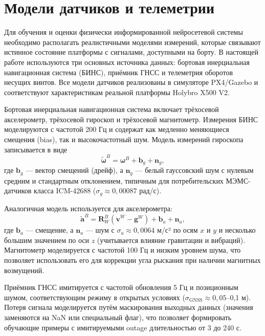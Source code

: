 \section{Модели датчиков и телеметрии}
\label{sec:sensor_models}

Для обучения и оценки физически информированной нейросетевой системы необходимо располагать реалистичными моделями измерений, которые связывают истинное состояние платформы с сигналами, доступными на борту. В настоящей работе используются три основных источника данных: бортовая инерциальная навигационная система (БИНС), приёмник ГНСС и телеметрия оборотов несущих винтов. Все модели датчиков реализованы в симуляторе PX4/Gazebo и соответствуют характеристикам реальной платформы Holybro X500 V2.

Бортовая инерциальная навигационная система включает трёхосевой акселерометр, трёхосевой гироскоп и трёхосевой магнитометр. Измерения БИНС моделируются с частотой 200 Гц и содержат как медленно меняющиеся смещения (bias), так и высокочастотный шум. Модель измерений гироскопа записывается в виде
\begin{equation}
	\tilde{\boldsymbol{\omega}}^B = \boldsymbol{\omega}^B + \mathbf{b}_g + \mathbf{n}_g,
\end{equation}
где \(\mathbf{b}_g\) — вектор смещений (дрейф), а \(\mathbf{n}_g\) — белый гауссовский шум с нулевым средним и стандартным отклонением, типичным для потребительских МЭМС-датчиков класса ICM-42688 (\(\sigma_g \approx 0{,}00087\) рад/с). 

Аналогичная модель используется для акселерометра:
\begin{equation}
	\tilde{\mathbf{a}}^B = \mathbf{R}^{B}_W (\dot{\mathbf{v}}^W - \mathbf{g}^W) + \mathbf{b}_a + \mathbf{n}_a,
\end{equation}
где \(\mathbf{b}_a\) — смещение, а \(\mathbf{n}_a\) — шум с \(\sigma_a \approx 0{,}0064\) м/с² по осям \(x\) и \(y\) и несколько большим значением по оси \(z\) (учитывается влияние гравитации и вибраций). Магнитометр моделируется с частотой 100 Гц и низким уровнем шума, что позволяет использовать его для коррекции угла рыскания при наличии магнитных возмущений.

Приёмник ГНСС имитируется с частотой обновления 5 Гц и позиционным шумом, соответствующим режиму в открытых условиях (\(\sigma_{\text{GNSS}} \approx 0{,}05\)–0{,}1 м). Потеря сигнала моделируется путём маскирования выходных данных (значения заменяются на NaN или специальный флаг), что позволяет формировать обучающие примеры с имитируемыми outage длительностью от 3 до 240 с.

